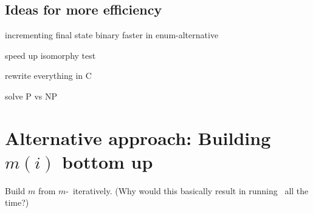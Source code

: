 \subsection{Ideas for more efficiency}

incrementing final state binary faster in enum-alternative

speed up isomorphy test

rewrite everything in C

solve P vs NP

\section{Alternative approach: Building $m(i)$ bottom up}

Build $m$ from $m$-\MinMark\ iteratively. (Why would this basically result in running \MinMark\ all the time?)
